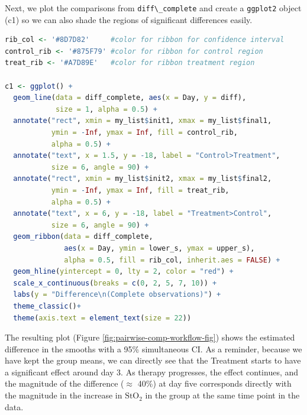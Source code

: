 \documentclass[
]{article}
\newcommand{\passthrough}[1]{#1}
\begin{document}
Next, we plot the comparisons from \passthrough{\lstinline!diff\_complete!} and create a \passthrough{\lstinline!ggplot2!} object (c1) so we can also shade the regions of significant differences easily.

\begin{lstlisting}[language=R]
rib_col <- '#8D7D82'     #color for ribbon for confidence interval
control_rib <- '#875F79' #color for ribbon for control region
treat_rib <- '#A7D89E'   #color for ribbon treatment region

c1 <- ggplot() +
  geom_line(data = diff_complete, aes(x = Day, y = diff), 
            size = 1, alpha = 0.5) +
  annotate("rect", xmin = my_list$init1, xmax = my_list$final1,
           ymin = -Inf, ymax = Inf, fill = control_rib,
           alpha = 0.5) + 
  annotate("text", x = 1.5, y = -18, label = "Control>Treatment",
           size = 6, angle = 90) +
  annotate("rect", xmin = my_list$init2, xmax = my_list$final2,
           ymin = -Inf, ymax = Inf, fill = treat_rib,
           alpha = 0.5) +
  annotate("text", x = 6, y = -18, label = "Treatment>Control",
           size = 6, angle = 90) +
  geom_ribbon(data = diff_complete, 
              aes(x = Day, ymin = lower_s, ymax = upper_s),
              alpha = 0.5, fill = rib_col, inherit.aes = FALSE) +
  geom_hline(yintercept = 0, lty = 2, color = "red") +
  scale_x_continuous(breaks = c(0, 2, 5, 7, 10)) +
  labs(y = "Difference\n(Complete observations)") +
  theme_classic()+
  theme(axis.text = element_text(size = 22))
\end{lstlisting}

The resulting plot (Figure \ref{fig:pairwise-comp-workflow-fig}) shows the estimated difference in the smooths with a 95\% simultaneous CI. As a reminder, because we have kept the group means, we can directly see that the Treatment starts to have a significant effect around day 3. As therapy progresses, the effect continues, and the magnitude of the difference (\(\approx\) 40\%) at day five corresponds directly with the magnitude in the increase in \(\mbox{StO}_2\) in the group at the same time point in the data.
\end{document}
